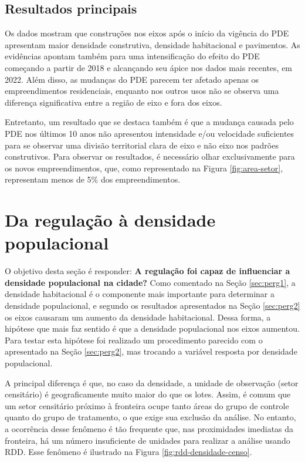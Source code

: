 




\subsection{Resultados principais}

Os dados mostram que construções nos eixos após o início da vigência do PDE apresentam maior densidade construtiva, densidade habitacional e pavimentos. As evidências apontam também para uma intensificação do efeito do PDE começando a partir de 2018 e alcançando seu ápice nos dados mais recentes, em 2022. Além disso, as mudanças do PDE parecem ter afetado apenas os empreendimentos residenciais, enquanto nos outros usos não se observa uma diferença significativa entre a região de eixo e fora dos eixos.

Entretanto, um resultado que se destaca também é que a mudança causada pelo PDE nos últimos 10 anos não apresentou intensidade e/ou velocidade suficientes para se observar uma divisão territorial clara de eixo e não eixo nos padrões construtivos. Para observar os resultados, é necessário olhar exclusivamente para os novos empreendimentos, que, como representado na Figura \ref{fig:area-setor}, representam menos de 5\% dos empreendimentos.

\clearpage
\section{Da regulação à densidade populacional}
\label{sec:perg3}

O objetivo desta seção é responder: \textbf{A regulação foi capaz de influenciar a densidade populacional na cidade?} Como comentado na Seção \ref{sec:perg1}, a densidade habitacional é o componente mais importante para determinar a densidade populacional, e segundo os resultados apresentados na Seção \ref{sec:perg2} os eixos causaram um aumento da densidade habitacional. Dessa forma, a hipótese que mais faz sentido é que a densidade populacional nos eixos aumentou. Para testar esta hipótese foi realizado um procedimento parecido com o apresentado na Seção \ref{sec:perg2}, mas trocando a variável resposta por densidade populacional.

A principal diferença é que, no caso da densidade, a unidade de observação (setor censitário) é geograficamente muito maior do que os lotes. Assim, é comum que um setor censitário próximo à fronteira ocupe tanto áreas do grupo de controle quanto do grupo de tratamento, o que exige sua exclusão da análise. No entanto, a ocorrência desse fenômeno é tão frequente que, nas proximidades imediatas da fronteira, há um número insuficiente de unidades para realizar a análise usando RDD. Esse fenômeno é ilustrado na Figura \ref{fig:rdd-densidade-censo}. 

